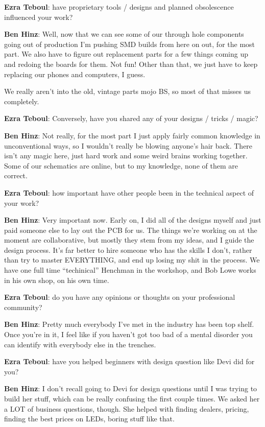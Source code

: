 \textbf{Ezra Teboul}: have proprietary tools / designs and planned obsolescence influenced
your work? 

\textbf{Ben Hinz}: Well, now that we can see some of our through hole components going out 
of production I'm pushing SMD builds from here on out, for the most part. We 
also have to figure out replacement parts for a few things coming up and redoing 
the boards for them. Not fun! Other than that, we just have to keep replacing our 
phones and computers, I guess.  

We really aren’t into the old, vintage parts mojo BS, so most of that misses 
us completely.

\textbf{Ezra Teboul}: Conversely, have you shared any of your designs / tricks / magic? 

\textbf{Ben Hinz}: Not really, for the most part I just apply fairly common knowledge in
unconventional ways, so I wouldn't really be blowing anyone's hair back. There 
isn’t any magic here, just hard work and some weird brains working together.  
Some of our schematics are online, but to my knowledge, none of them 
are correct. 

\textbf{Ezra Teboul}: how important have other people been in the technical aspect of your
work? 

\textbf{Ben Hinz}: Very important now. Early on, I did all of the designs myself and just paid 
someone else to lay out the PCB for us. The things we're working on at the 
moment are collaborative, but mostly they stem from my ideas, and I guide the 
design process. It's far better to hire someone who has the skills I don't, rather 
than try to master EVERYTHING, and end up losing my shit in the process. We 
have one full time ``techinical'' Henchman in the workshop, and Bob Lowe works 
in his own shop, on his own time. 

\textbf{Ezra Teboul}: do you have any opinions or thoughts on your professional community? 

\textbf{Ben Hinz}: Pretty much everybody I've met in the industry has been top shelf. Once 
you're in it, I feel like if you haven't got too bad of a mental disorder you can 
identify with everybody else in the trenches. 

\textbf{Ezra Teboul}: have you helped beginners with design question like Devi did for you? 

\textbf{Ben Hinz}: I don't recall going to Devi for design questions until I was trying to build 
her stuff, which can be really confusing the first couple times. We asked her a 
LOT of business questions, though.  She helped with finding dealers, pricing, 
finding the best prices on LEDs, boring stuff like that. 

